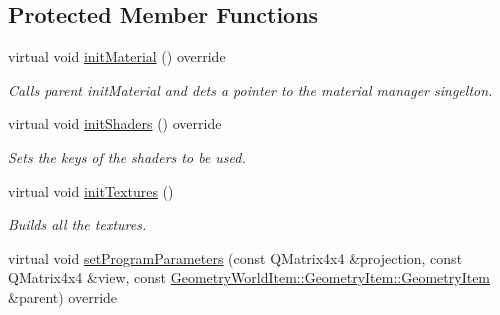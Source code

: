 \subsection*{Protected Member Functions}
\begin{DoxyCompactItemize}
\item 
\mbox{\label{class_geometry_engine_1_1_geometry_material_1_1_multi_texture_material_a8b14ccf51c5360824575544a56eeac39}} 
virtual void \mbox{\hyperlink{class_geometry_engine_1_1_geometry_material_1_1_multi_texture_material_a8b14ccf51c5360824575544a56eeac39}{init\+Material}} () override
\begin{DoxyCompactList}\small\item\em Calls parent init\+Material and dets a pointer to the material manager singelton. \end{DoxyCompactList}\item 
\mbox{\label{class_geometry_engine_1_1_geometry_material_1_1_multi_texture_material_aa5dd9c755aa814d4655355227aa68d1d}} 
virtual void \mbox{\hyperlink{class_geometry_engine_1_1_geometry_material_1_1_multi_texture_material_aa5dd9c755aa814d4655355227aa68d1d}{init\+Shaders}} () override
\begin{DoxyCompactList}\small\item\em Sets the keys of the shaders to be used. \end{DoxyCompactList}\item 
\mbox{\label{class_geometry_engine_1_1_geometry_material_1_1_multi_texture_material_a236d4a16f756444e8a3ed5997efabb2e}} 
virtual void \mbox{\hyperlink{class_geometry_engine_1_1_geometry_material_1_1_multi_texture_material_a236d4a16f756444e8a3ed5997efabb2e}{init\+Textures}} ()
\begin{DoxyCompactList}\small\item\em Builds all the textures. \end{DoxyCompactList}\item 
virtual void \mbox{\hyperlink{class_geometry_engine_1_1_geometry_material_1_1_multi_texture_material_a5f07e3b2b0867d3905f912159ef2f67b}{set\+Program\+Parameters}} (const Q\+Matrix4x4 \&projection, const Q\+Matrix4x4 \&view, const \mbox{\hyperlink{class_geometry_engine_1_1_geometry_world_item_1_1_geometry_item_1_1_geometry_item}{Geometry\+World\+Item\+::\+Geometry\+Item\+::\+Geometry\+Item}} \&parent) override

\end{DoxyCompactItemize}
